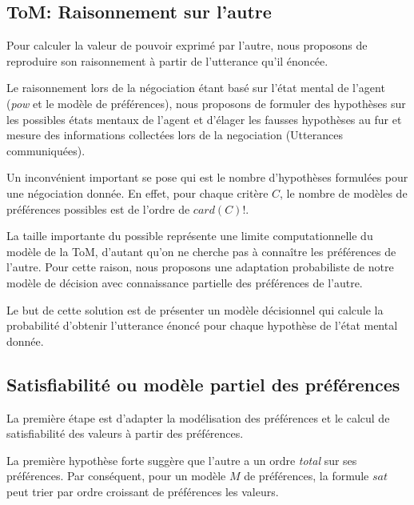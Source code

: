 \documentclass{llncs}
\begin{document}
	
	\subsection{ToM: Raisonnement sur l'autre}
	
	
	Pour calculer la valeur de pouvoir exprimé par l'autre, nous proposons de reproduire son raisonnement à partir de l'utterance qu'il énoncée.
	
	Le raisonnement lors de la négociation étant basé  sur l'état mental de l'agent (\textit{pow} et le modèle de préférences), nous proposons de formuler des hypothèses sur les possibles états mentaux de l'agent et d'élager les fausses hypothèses au fur et mesure des informations collectées lors de la negociation (Utterances communiquées).
	
	Un inconvénient important se pose qui est le nombre d'hypothèses formulées pour une négociation donnée. En effet, pour chaque critère $C$, le nombre de modèles de préférences possibles est de l'ordre de $card(C) !$. 
	
	La taille importante du possible représente une limite computationnelle du modèle de la ToM, d'autant qu'on ne cherche pas à connaître les préférences de l'autre. Pour cette raison, nous proposons une adaptation probabiliste de notre modèle de décision avec connaissance partielle des préférences de l'autre. 
	
	Le but de cette solution est de présenter un modèle décisionnel qui calcule la probabilité d'obtenir l'utterance énoncé pour chaque hypothèse de l’état mental donnée. 
	
	
	\subsection{Satisfiabilité ou modèle partiel des préférences}
	La première étape est d'adapter la modélisation des préférences et le calcul de satisfiabilité des valeurs à partir des préférences.
	
	La première hypothèse forte suggère que l'autre a un ordre \emph{total} sur ses préférences. Par conséquent, pour un modèle $M$ de préférences, la formule $sat$ peut trier par ordre croissant de préférences les valeurs.  
	
\end{document}
